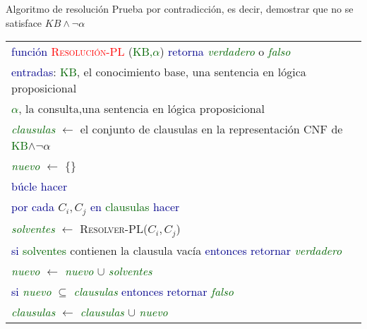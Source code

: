 \begin{frame}{Algoritmo de resolución}
	Prueba por contradicción, es decir, demostrar que no se satisface \textcolor{DarkPurple}{$KB \land \neg\alpha$}
	\begin{center}
		\begin{tabular}{|l|}
		\hline
		{\footnotesize
			\textcolor{DarkBlue}{función} \textcolor{Red}{\textsc{Resolución-PL}}								(\textcolor{DarkGreen}{KB,{$\alpha$}}) \textcolor{DarkBlue}{retorna} 								\textcolor{DarkGreen}{\textit{verdadero}} o \textcolor{DarkGreen}{\emph{falso}}
		}
		\\
		{\footnotesize
			\qquad 
			\textcolor{DarkBlue}{entradas}: \textcolor{DarkGreen}{KB}, el conocimiento base, 					una	sentencia en lógica proposicional 
		}
		\\	
		{\footnotesize
			\qquad
			\quad\quad\quad\quad\quad
			\textcolor{DarkGreen}{$\alpha$}, la consulta,una sentencia en lógica proposicional 
		}
		\\
		{\footnotesize
			\qquad
			\textcolor{DarkGreen}{\textit{clausulas}} {$\leftarrow$} el conjunto de clausulas en la 				representación CNF de \textcolor{DarkGreen}{KB}{$ \land \neg\alpha$}
		}
		\\
		{\footnotesize
			\qquad
			\textcolor{DarkGreen}{\textit{nuevo}} {$\leftarrow$} {$\{\}$}
		}
		\\
		{\footnotesize
			\qquad
			\textcolor{DarkBlue}{búcle hacer}	
		}
    	\\
    	{\footnotesize
			\qquad\qquad
			\textcolor{DarkBlue}{por cada} {$C_i, C_j$} \textcolor{DarkBlue}{en} 								\textcolor{DarkGreen}{clausulas} \textcolor{DarkBlue}{hacer}	
		}
    	\\
    	{\footnotesize
			\qquad\qquad\qquad
			\textcolor{DarkGreen}{\textit{solventes}} {$\leftarrow$} \textsc{Resolver-PL}({$C_i, C_j				$})
		}
    	\\
    	{\footnotesize
			\qquad\qquad\qquad
			\textcolor{DarkBlue}{si} \textcolor{DarkGreen}{solventes} contienen la clausula vacía 				\textcolor{DarkBlue}{entonces retornar} \textcolor{DarkGreen}{\textit{verdadero}}		
		}
    	\\
    	{\footnotesize
			\qquad\qquad\qquad
			\textcolor{DarkGreen}{\textit{nuevo}} {$\leftarrow$} \textcolor{DarkGreen}							{\textit{nuevo}} {$\cup$} \textcolor{DarkGreen}{\textit{solventes}}
		}
    	\\
    	{\footnotesize
			\qquad\qquad
			\textcolor{DarkBlue}{si} \textcolor{DarkGreen}{\textit{nuevo}} {$\subseteq$}						\textcolor{DarkGreen}{\textit{clausulas}} \textcolor{DarkBlue}{entonces retornar} 					\textcolor{DarkGreen}{\textit{falso}}		
		}
    	\\
    	{\footnotesize
			\qquad\qquad
			\textcolor{DarkGreen}{\textit{clausulas}} {$\leftarrow$} \textcolor{DarkGreen}						{\textit{clausulas}} {$\cup$} \textcolor{DarkGreen}{\textit{nuevo}}
		}
    	\\
   		\hline
   		

\end{tabular}
\end{center}
\end{frame}
